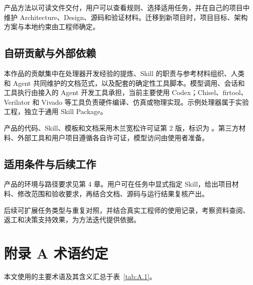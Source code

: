 \documentclass[UTF8,fontset=none,zihao=-4,a4paper]{ctexart}
\begin{document}
产品方法以可读文件交付，用户可以查看规则、选择适用任务，并在自己的项目中维护 Architecture、Design、源码和验证材料。迁移到新项目时，项目目标、架构方案与本地约束由工程师确定。

\Needspace{70mm}
\subsection{自研贡献与外部依赖}

本作品的贡献集中在处理器开发经验的提炼、Skill 的职责与参考材料组织、人类和 Agent 共同维护的文档范式，以及配套的确定性工具脚本。模型调用、会话和工具执行由接入的 Agent 开发工具承担，当前主要使用 Codex；Chisel、firtool、Verilator 和 Vivado 等工具负责硬件编译、仿真或物理实现。示例处理器属于实验工程，独立于通用 Skill Package。

产品的代码、Skill、模板和文档采用木兰宽松许可证第 2 版，标识为 。第三方材料、外部工具和用户项目遵循各自许可证，模型访问由使用者准备。

\subsection{适用条件与后续工作}

产品的环境与路径要求见第 4 章。用户可在任务中显式指定 Skill，给出项目材料、修改范围和验收要求，再结合文档、源码与运行结果复核产出。


后续可扩展任务类型与重复对照，并结合真实工程师的使用记录，考察资料查阅、返工和决策支持效果，为方法迭代提供依据。

\clearpage
\setcounter{table}{0}
\renewcommand{\thetable}{A.\arabic{table}}
\renewcommand{\theHtable}{A.\arabic{table}}
\section*{附录 A 术语约定}

本文使用的主要术语及其含义汇总于表~\ref{tab:A.1}。
\end{document}
